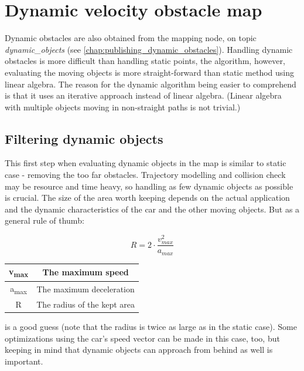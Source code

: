 \section{Dynamic velocity obstacle map}
\label{chap:dynamic_velocity_obstacle_map}
Dynamic obstacles are also obtained from the mapping node, on topic \textit{dynamic\_objects} (see \ref{chap:publishing_dynamic_obstacles}).
Handling dynamic obstacles is more difficult than handling static points, the algorithm, however, evaluating the moving objects is more straight-forward than static method using linear algebra. The reason for the dynamic algorithm being easier to comprehend is that it uses an iterative approach instead of linear algebra. (Linear algebra with multiple objects moving in non-straight paths is not trivial.)

\subsection{Filtering dynamic objects}
This first step when evaluating dynamic objects in the map is similar to static case - removing the too far obstacles. Trajectory modelling and collision check may be  resource and time heavy, so handling as few dynamic objects as possible is crucial. The size of the area worth keeping depends on the actual application and the dynamic characteristics of the car and the other moving objects. But as a general rule of thumb:

\[ R = 2 \cdot \frac{v_{max}^2}{a_{max}} \]

\begin{center}
    \begin{tabular}{ | c | c | }
        \hline
        v\textsubscript{max}	& The maximum speed    			\\
        \hline
        a\textsubscript{max}  	& The maximum deceleration      \\
        \hline
        R  						& The radius of the kept area	\\
        \hline
    \end{tabular}
\end{center}

is a good guess (note that the radius is twice as large as in the static case). Some optimizations using the car's speed vector can be made in this case, too, but keeping in mind that dynamic objects can approach from behind as well is important.

